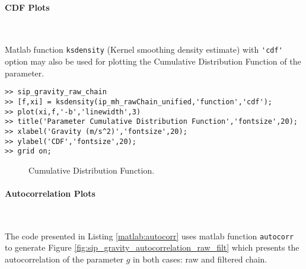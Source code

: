 

\paragraph{CDF Plots} \

Matlab function \verb+ksdensity+ (Kernel smoothing density estimate) with \verb+'cdf'+ option
may also be used for plotting the Cumulative Distribution Function of the parameter.

\begin{lstlisting}[label=matlab:cdf,caption={Matlab code for the CDF plot.}]
% inside Matlab
>> sip_gravity_raw_chain
>> [f,xi] = ksdensity(ip_mh_rawChain_unified,'function','cdf');
>> plot(xi,f,'-b','linewidth',3)
>> title('Parameter Cumulative Distribution Function','fontsize',20);
>> xlabel('Gravity (m/s^2)','fontsize',20);
>> ylabel('CDF','fontsize',20);
>> grid on;
\end{lstlisting}

\begin{figure}[p]
\centering
{}
\vspace*{-10pt}
\caption{Cumulative Distribution Function. }
\end{figure}

\paragraph{Autocorrelation Plots}\

The code presented in Listing \ref{matlab:autocorr} uses matlab function \verb+autocorr+ to generate
Figure \ref{fig:sip_gravity_autocorrelation_raw_filt}
which presents the autocorrelation of the parameter $g$ in both cases: raw and filtered chain.

